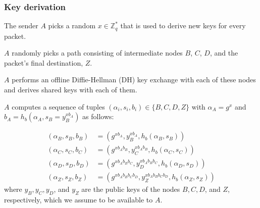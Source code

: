 \subsubsection{Key derivation}
\label{sec:sphinx:keyderivation}

The sender $A$ picks a random $x\in \mathbb{Z}^*_q$ that is used to derive new keys for every packet.

$A$ randomly picks a path consisting of intermediate nodes $B$, $C$, $D$, and the packet's final destination, $Z$.

$A$ performs an offline Diffie-Hellman (DH) key exchange with each of these nodes and derives shared keys with each of them.

$A$ computes a sequence of tuples $(\alpha_i,s_i,b_i) \in \{ B, C, D, Z \}$ with $\alpha_A = g^x$ and $b_A = h_b(\alpha_A, s_B = y_B^{x b_A})$ as follows:

\begin{align}
    \nonumber(\alpha_B,s_B,b_B) & = (g^{x b_A},y_B^{x b_A},h_b(\alpha_B,s_B))                         \\
    \nonumber(\alpha_C,s_C,b_C) & = (g^{x b_A b_B},y_C^{x b_A b_B},h_b(\alpha_C,s_C))                 \\
    \nonumber(\alpha_D,s_D,b_D) & = (g^{x b_A b_B b_C},y_D^{x b_A b_B b_C},h_b(\alpha_D,s_D))         \\
    (\alpha_Z,s_Z,b_Z)          & = (g^{x b_A b_B b_C b_D},y_Z^{x b_A b_B b_C b_D},h_b(\alpha_Z,s_Z))
    \label{eq:1}
\end{align}
where $y_B, y_C, y_D$, and $y_Z$ are the public keys of the nodes $B, C, D$, and $Z$, respectively, which we assume to be available to $A$.

